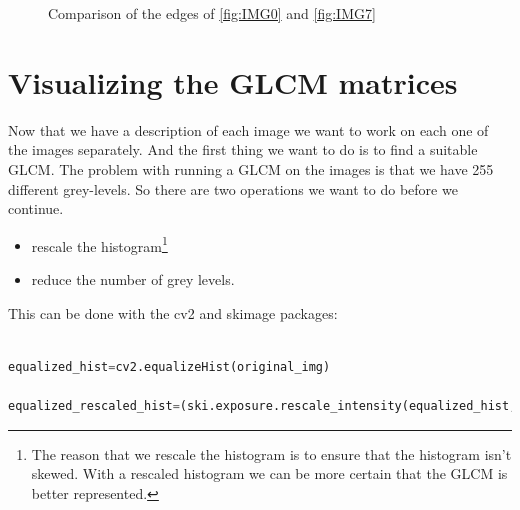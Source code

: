 \documentclass{article}
\begin{document}
\newpage

\begin{figure}[h]%
	\centering
    \qquad
    \caption{Comparison of the edges of \ref{fig:IMG0} and \ref{fig:IMG7}}%
    \label{fig:ING17CANNY}%
\end{figure}



\newpage

\section{Visualizing the GLCM matrices}

Now that we have a description of each image we want to work on each one of the images separately. And the first thing we want to do is to find a suitable GLCM.
The problem with running a GLCM on the images is that we have 255 different grey-levels. So there are two operations we want to do before we continue.\\
\begin{itemize}
	\item rescale the histogram\footnote{The reason that we rescale the histogram is to ensure that the histogram isn't skewed. With a rescaled histogram we can be more certain that the GLCM is better represented.}
	\item reduce the number of grey levels.
\end{itemize}    

This can be done with the cv2 and skimage packages:
\begin{lstlisting}[language=python]

equalized_hist=cv2.equalizeHist(original_img)

equalized_rescaled_hist=(ski.exposure.rescale_intensity(equalized_hist, out_range=(0, 15)))
\end{lstlisting}
\end{document}
